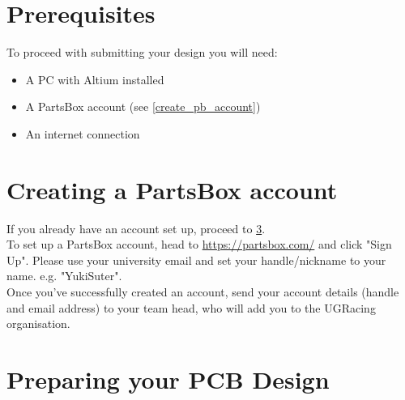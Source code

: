 \section{Prerequisites}
To proceed with submitting your design you will need:
\begin{itemize}
    \item A PC with Altium installed
    \item A PartsBox account (see \cref{create_pb_account})
    \item An internet connection
\end{itemize}

\section{Creating a PartsBox account}
If you already have an account set up, proceed to \cref{prepare}.\\

To set up a PartsBox account, head to \href{https://partsbox.com/}{https://partsbox.com/} and click "Sign Up". Please use your university email and set your handle/nickname to your name. e.g. "YukiSuter".\\

Once you've successfully created an account, send your account details (handle and email address) to your team head, who will add you to the UGRacing organisation.

\newpage

\section{Preparing your PCB Design}\label{prepare}

